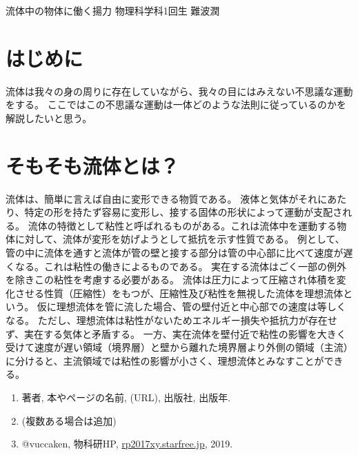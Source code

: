 \documentclass[10pt,b5paper,papersize,dvipdfmx]{jsbook}
\begin{document}

\kaishititle%
  {流体中の物体に働く揚力}%
  {物理科学科1回生}%
  {難波潤}%


%
\section*{はじめに}
流体は我々の身の周りに存在していながら、我々の目にはみえない不思議な運動をする。
ここではこの不思議な運動は一体どのような法則に従っているのかを解説したいと思う。
%
\section{そもそも流体とは？}
流体は、簡単に言えば自由に変形できる物質である。
液体と気体がそれにあたり、特定の形を持たず容易に変形し、接する固体の形状によって運動が支配される。
流体の特徴として粘性と呼ばれるものがある。これは流体中を運動する物体に対して、流体が変形を妨げようとして抵抗を示す性質である。
例として、管の中に流体を通すと流体が管の壁と接する部分は管の中心部に比べて速度が遅くなる。これは粘性の働きによるものである。
実在する流体はごく一部の例外を除きこの粘性を考慮する必要がある。
流体は圧力によって圧縮され体積を変化させる性質（圧縮性）をもつが、圧縮性及び粘性を無視した流体を理想流体という。
仮に理想流体を管に流した場合、管の壁付近と中心部での速度は等しくなる。
ただし、理想流体は粘性がないためエネルギー損失や抵抗力が存在せず、実在する気体と矛盾する。
一方、実在流体を壁付近で粘性の影響を大きく受けて速度が遅い領域（境界層）と壁から離れた境界層より外側の領域（主流）に分けると、主流領域では粘性の影響が小さく、理想流体とみなすことができる。

\begin{sanko}
  \begin{enumerate}
    \item 著者, 本やページの名前, (URL), 出版社, 出版年.
    \item (複数ある場合は追加)
    \item @vuccaken, 物科研HP, \url{rp2017xy.starfree.jp}, 2019.
  \end{enumerate}
\end{sanko}
\end{document}
